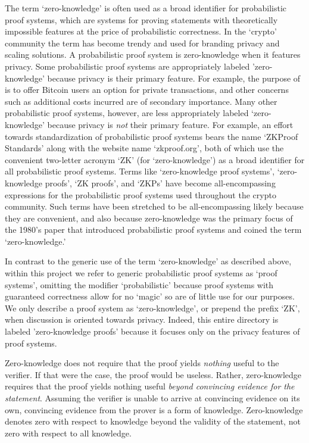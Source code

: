 
\begin{remark}
    The term `zero-knowledge' is often used as a broad identifier for probabilistic proof systems, which are systems for proving statements with theoretically impossible features at the price of probabilistic correctness.
    In the `crypto' community the term has become trendy and used for branding privacy and scaling solutions.
    A probabilistic proof system is zero-knowledge when it features privacy. 
    Some probabilistic proof systems are appropriately labeled 'zero-knowledge' because privacy is their primary feature.
    For example, the purpose of  is to offer Bitcoin users an option for private transactions, and other concerns such as additional costs incurred are of secondary importance.
    Many other probabilistic proof systems, however, are less appropriately labeled `zero-knowledge' because privacy is \emph{not} their primary feature.
    For example, an effort towards standardization of probabilistic proof systems bears the name `ZKProof Standards' along with the website name `zkproof.org', both of which use the convenient two-letter acronym `ZK' (for `zero-knowledge') as a broad identifier for all probabilistic proof systems. 
    Terms like `zero-knowledge proof systems', `zero-knowledge proofs', `ZK proofs', and `ZKPs' have become all-encompassing expressions for the probabilistic proof systems used throughout the crypto community.
    Such terms have been stretched to be all-encompassing likely because they are convenient, and also because zero-knowledge was the primary focus of the 1980's paper \cite{GMR85} that introduced probabilistic proof systems and coined the term `zero-knowledge.'

    In contrast to the generic use of the term `zero-knowledge' as described above, within this project we refer to generic probabilistic proof systems as `proof systems', omitting the modifier `probabilistic' because proof systems with guaranteed correctness allow for no `magic' so are of little use for our purposes.
    We only describe a proof system as `zero-knowledge', or prepend the prefix `ZK', when discussion is oriented towards privacy.
    Indeed, this entire directory is labeled 'zero-knowledge proofs' because it focuses only on the privacy features of proof systems.
\end{remark}

\begin{remark}
    Zero-knowledge does not require that the proof yields \emph{nothing} useful to the verifier.
    If that were the case, the proof would be useless.
    Rather, zero-knowledge requires that the proof yields nothing useful \emph{beyond convincing evidence for the statement}.
    Assuming the verifier is unable to arrive at convincing evidence on its own, convincing evidence from the prover is a form of knowledge.
    Zero-knowledge denotes zero with respect to knowledge beyond the validity of the statement, not zero with respect to all knowledge.
\end{remark}


